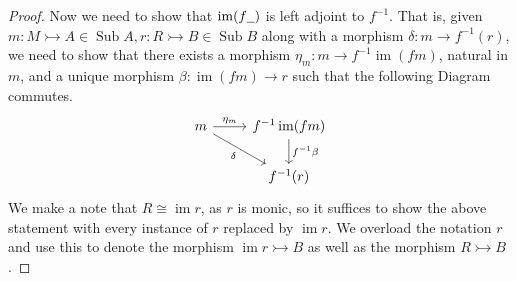 \documentclass{tac}
\newcommand{\und}[1]{\underline{\hspace{#1 cm}}}
\newcommand{\lto}{\longrightarrow}
\begin{document}
\begin{proof}
		Now we need to show that $\operatorname{im}(f\und{0.2})$ is left adjoint to $f^{-1}$. That is, given $m: M \rightarrowtail A \in \operatorname{Sub}A, r: R \rightarrowtail B \in \operatorname{Sub}B$ along with a morphism $\delta:m \lto f^{-1}(r)$, we need to show that there exists a morphism $\eta_m: m \lto f^{-1}\operatorname{im}(fm)$, natural in $m$, and a unique morphism $\beta:\operatorname{im}(fm) \lto r$ such that the following Diagram commutes.
		\begin{equation}
			\begin{tikzcd}
				m\arrow[r,"{
					\eta_{m}}"]\arrow[dr,swap,"{\delta}"] & f^{-1}\operatorname{im}(fm)\arrow[d,"{f^{-1}\beta}"]\\
				& f^{-1}(r)
			\end{tikzcd}
		\end{equation}
		We make a note that $R \cong \operatorname{im}r$, as $r$ is monic, so it suffices to show the above statement with every instance of $r$ replaced by $\operatorname{im}r$. We overload the notation $r$ and use this to denote the morphism $\operatorname{im}r \rightarrowtail B$ as well as the morphism $R \rightarrowtail B$.
		

\end{proof}
\end{document}
